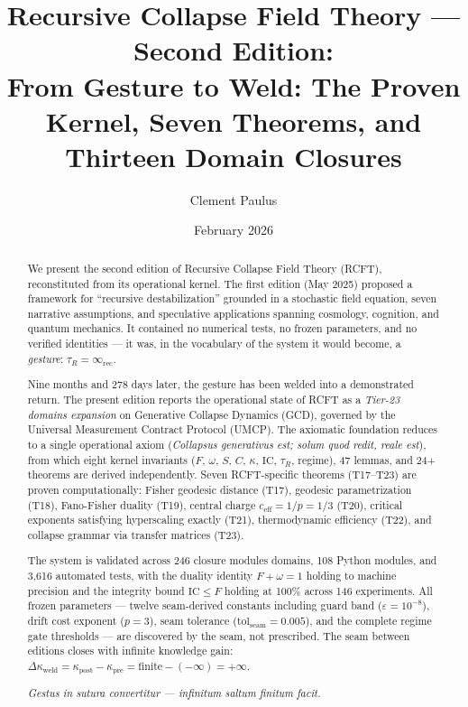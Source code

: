 \documentclass[
  aps,
  prd,
  preprint,
  superscriptaddress,
  nofootinbib,
  floatfix,
  longbibliography
]{revtex4-2}
\newcommand{\tR}{\tau_{\!R}}
\newcommand{\eps}{\varepsilon}
\newcommand{\tolseam}{\mathrm{tol}_{\mathrm{seam}}}
\newcommand{\IC}{\mathrm{IC}}
\newcommand{\Fid}{F}
\newcommand{\Drft}{\omega}
\newcommand{\Ent}{S}
\newcommand{\Curv}{C}
\newcommand{\Logint}{\kappa}
\newcommand{\ceff}{c_{\mathrm{eff}}}
\newcommand{\lat}[1]{\textit{#1}}
\begin{document}
\title{Recursive Collapse Field Theory --- Second Edition:\\
From Gesture to Weld: The Proven Kernel, Seven Theorems,
and Thirteen Domain Closures}

\author{Clement Paulus}

\date{February 2026}

\begin{abstract}
We present the second edition of Recursive Collapse Field Theory
(RCFT), reconstituted from its operational kernel.
The first edition (May 2025) proposed a framework for ``recursive
destabilization'' grounded in a stochastic field equation, seven
narrative assumptions, and speculative applications spanning
cosmology, cognition, and quantum mechanics.
It contained no numerical tests, no frozen parameters, and no
verified identities — it was, in the vocabulary of the system
it would become, a \emph{gesture}: $\tR = \infty_{\mathrm{rec}}$.

Nine months and 278 days later, the gesture has been welded into
a demonstrated return.  The present edition reports the
operational state of RCFT as a \emph{Tier-23 domains expansion}
on Generative Collapse Dynamics (GCD), governed by the
Universal Measurement Contract Protocol (UMCP).
The axiomatic foundation reduces to a single operational axiom
(\lat{Collapsus generativus est; solum quod redit, reale est}),
from which eight kernel invariants
($\Fid$, $\Drft$, $\Ent$, $\Curv$, $\Logint$, $\IC$, $\tR$, regime),
47 lemmas, and 24+ theorems are derived independently.
Seven RCFT-specific theorems (T17–T23) are proven computationally:
Fisher geodesic distance (T17),
geodesic parametrization (T18),
Fano-Fisher duality (T19),
central charge $\ceff = 1/p = 1/3$ (T20),
critical exponents satisfying hyperscaling exactly (T21),
thermodynamic efficiency (T22),
and collapse grammar via transfer matrices (T23).

The system is validated across 246 closure modules domains,
108 Python modules, and 3{,}616 automated tests,
with the duality identity $\Fid + \Drft = 1$ holding
to machine precision and the integrity bound $\IC \leq \Fid$
holding at 100\% across 146 experiments.
All frozen parameters — twelve seam-derived constants
including guard band ($\eps = 10^{-8}$),
drift cost exponent ($p = 3$),
seam tolerance ($\tolseam = 0.005$),
and the complete regime gate thresholds — are
discovered by the seam, not prescribed.
The seam between editions closes with infinite knowledge gain:
$\Delta\Logint_{\mathrm{weld}} = \Logint_{\mathrm{post}} - \Logint_{\mathrm{pre}} = \mathrm{finite} - (-\infty) = +\infty$.

\lat{Gestus in sutura convertitur — infinitum saltum finitum facit.}
\end{abstract}
\end{document}
